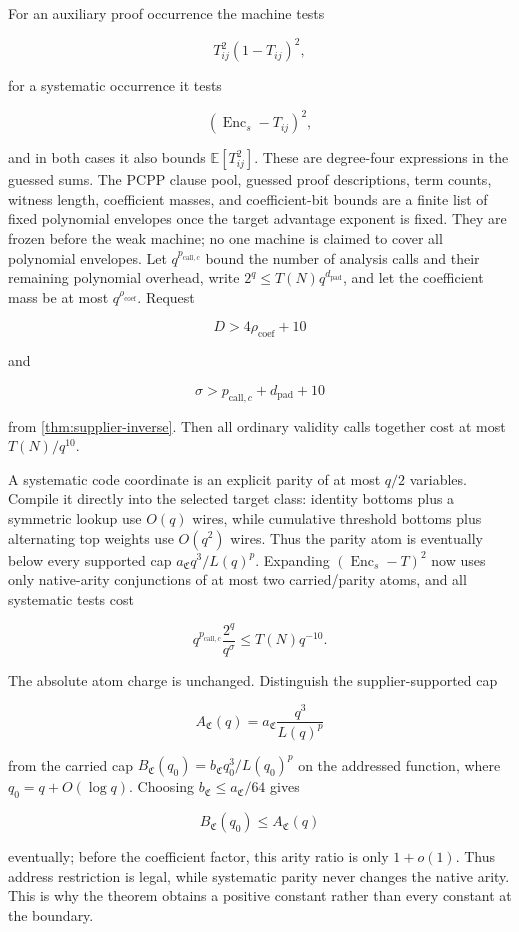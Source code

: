\documentclass[11pt,letterpaper]{article}
\newcommand{\cref}[1]{\ref{#1}}
\theoremstyle{definition}
\theoremstyle{remark}
\begin{document}
For an auxiliary proof occurrence the machine tests

\[
T_{ij}^2(1-T_{ij})^2,
\]

for a systematic occurrence it tests

\[
(\operatorname{Enc}_s-T_{ij})^2,
\]

and in both cases it also bounds \(\mathbb E[T_{ij}^2]\). These are
degree-four expressions in the guessed sums. The PCPP clause pool,
guessed proof descriptions, term counts, witness length, coefficient
masses, and coefficient-bit bounds are a finite list of fixed polynomial
envelopes once the target advantage exponent is fixed. They are frozen
before the weak machine; no one machine is claimed to cover all
polynomial envelopes. Let \(q^{p_{\mathrm{call},c}}\) bound the number
of analysis calls and their remaining polynomial overhead, write
\(2^q\le T(N)q^{d_{\mathrm{pad}}}\), and let the coefficient mass be at
most \(q^{\rho_{\mathrm{coef}}}\). Request

\[
D>4\rho_{\mathrm{coef}}+10
\]

and

\[
\sigma>p_{\mathrm{call},c}+d_{\mathrm{pad}}+10
\]

from \cref{thm:supplier-inverse}. Then all ordinary validity calls together cost at most
\(T(N)/q^{10}\).

A systematic code coordinate is an explicit parity of at most \(q/2\)
variables. Compile it directly into the selected target class: identity
bottoms plus a symmetric lookup use \(O(q)\) wires, while cumulative
threshold bottoms plus alternating top weights use \(O(q^2)\) wires.
Thus the parity atom is eventually below every supported cap
\(a_{\mathfrak C}q^3/L(q)^p\). Expanding \((\operatorname{Enc}_s-T)^2\)
now uses only native-arity conjunctions of at most two carried/parity
atoms, and all systematic tests cost

\[
q^{p_{\mathrm{call},c}}\frac{2^q}{q^\sigma}
\le
T(N)q^{-10}.
\]

The absolute atom charge is unchanged. Distinguish the
supplier-supported cap

\[
A_{\mathfrak C}(q)=a_{\mathfrak C}\frac{q^3}{L(q)^p}
\]

from the carried cap
\(B_{\mathfrak C}(q_0)=b_{\mathfrak C}q_0^3/L(q_0)^p\) on the addressed
function, where \(q_0=q+O(\log q)\). Choosing
\(b_{\mathfrak C}\le a_{\mathfrak C}/64\) gives

\[
B_{\mathfrak C}(q_0)\le A_{\mathfrak C}(q)
\]

eventually; before the coefficient factor, this arity ratio is only
\(1+o(1)\). Thus address restriction is legal, while systematic parity
never changes the native arity. This is why the theorem obtains a
positive constant rather than every constant at the boundary.
\end{document}
